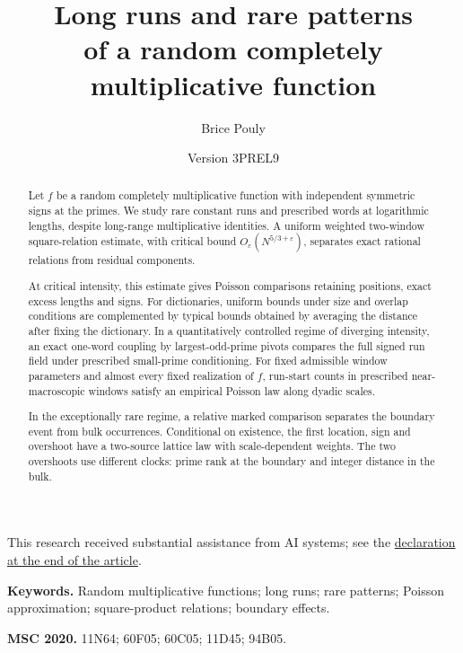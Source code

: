 \documentclass[11pt,a4paper]{article}
\title{\textbf{Long runs and rare patterns}\\[1mm]
\large of a random completely multiplicative function}
\author{Brice Pouly}
\date{Version 3PREL9}
\begin{document}
\maketitle
\vspace{-0.6em}
\noindent\begin{minipage}{\textwidth}\footnotesize
This research received substantial assistance from AI systems; see the
\hyperref[sec:ai-assistance]{declaration at the end of the article}.
\end{minipage}\medskip
\begin{abstract}
Let $f$ be a random completely multiplicative function with independent
symmetric signs at the primes. We study rare constant runs and prescribed
words at logarithmic lengths, despite long-range multiplicative identities.
A uniform weighted two-window square-relation estimate, with critical
bound $O_\varepsilon(N^{5/3+\varepsilon})$, separates exact rational
relations from residual components.

At critical intensity, this estimate gives Poisson comparisons retaining
positions, exact excess lengths and signs. For dictionaries, uniform
bounds under size and overlap conditions are complemented by typical
bounds obtained by averaging the distance after fixing the dictionary.
In a quantitatively controlled regime of diverging intensity, an exact
one-word coupling by largest-odd-prime pivots compares the full signed
run field under prescribed small-prime conditioning. For fixed
admissible window parameters and almost every fixed realization of $f$,
run-start counts in prescribed near-macroscopic windows satisfy an
empirical Poisson law along dyadic scales.

In the exceptionally rare regime, a relative marked comparison separates
the boundary event from bulk occurrences. Conditional on existence, the
first location, sign and overshoot have a two-source lattice law with
scale-dependent weights. The two overshoots use different clocks: prime
rank at the boundary and integer distance in the bulk.
\end{abstract}

\medskip
\noindent\textbf{Keywords.} Random multiplicative functions; long runs;
rare patterns; Poisson approximation; square-product relations; boundary effects.
\par\smallskip
\noindent\textbf{MSC 2020.} 11N64; 60F05; 60C05; 11D45; 94B05.
\clearpage
\tableofcontents









\printbibliography[heading=bibintoc,title={References}]
\end{document}
